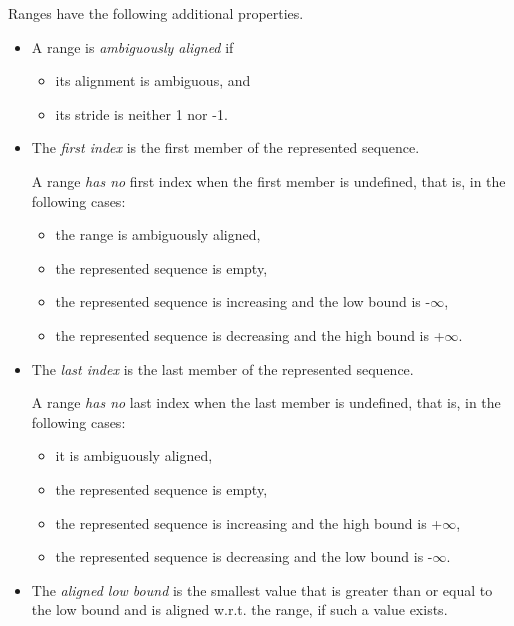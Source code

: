 Ranges have the following additional properties.
\begin{itemize}

\item A range is \emph{ambiguously aligned} if
  \begin{itemize}
  \item its alignment is ambiguous, and
  \item its stride is neither 1 nor -1.
  \end{itemize}

\item The \emph{first index} is the first member of the represented sequence.

  A range \emph{has no} first index when the first member is undefined,
  that is, in the following cases:
  \begin{itemize}
  \item the range is ambiguously aligned,
  \item the represented sequence is empty,
  \item the represented sequence is increasing and the low bound is -$\infty$,
  \item the represented sequence is decreasing and the high bound is +$\infty$.
  \end{itemize}

\item The \emph{last index} is the last member of the represented sequence.

  A range \emph{has no} last index when the last member is undefined,
  that is, in the following cases:
  \begin{itemize}
  \item it is ambiguously aligned,
  \item the represented sequence is empty,
  \item the represented sequence is increasing and the high bound is +$\infty$,
  \item the represented sequence is decreasing and the low bound is -$\infty$.
  \end{itemize}

\item The \emph{aligned low bound} is the smallest value that is
  greater than or equal to the low bound and is aligned w.r.t. the range,
  if such a value exists.


\end{itemize}
